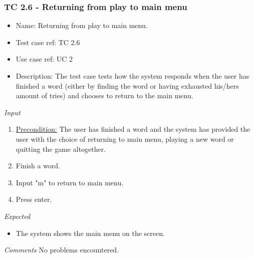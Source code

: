 \documentclass[12pt, letterpaper]{article}
\begin{document}
\subsubsection{TC 2.6 - Returning from play to main menu}
\begin{itemize}
	\item Name: Returning from play to main menu.
	\item Test case ref: TC 2.6
	\item Use case ref: UC 2
	\item Description: The test case tests how the system responds when the user has finished a word (either by finding the word or having exhausted his/hers amount of tries) and chooses to return to the main menu.
\end{itemize}
\emph{Input}
\begin{enumerate}
	\item \underline{Precondition:} The user has finished a word and the system has provided the user with the choice of returning to main menu, playing a new word or quitting the game altogether.
	\item Finish a word.
	\item Input "m" to return to main menu.
	\item Press enter.
\end{enumerate}
\emph{Expected}
\begin{itemize}
	\item The system shows the main menu on the screen.
\end{itemize}
\begin{Form}
	\newline
	\newline
\end{Form}
\newline
\emph{Comments}
No problems encountered.
\end{document}
